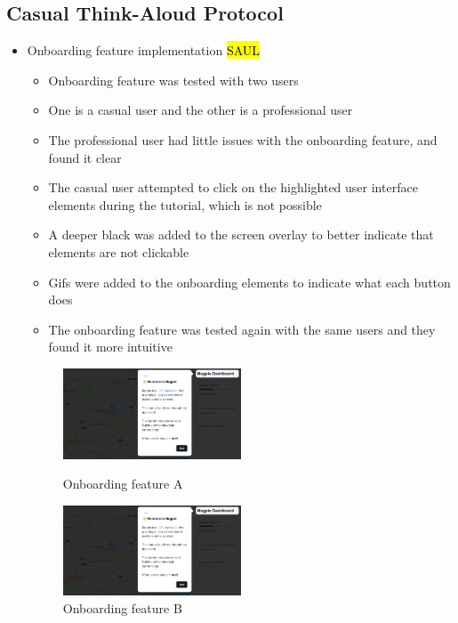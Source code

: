 \documentclass{report}
\begin{document}
\subsection{Casual Think-Aloud Protocol}
\begin{itemize}
    \item Onboarding feature implementation \hl{SAUL}
    \begin{itemize}
        \item Onboarding feature was tested with two users
        \item One is a casual user and the other is a professional user
        \item The professional user had little issues with the onboarding
        feature, and found it clear
        \item The casual user attempted to click on the highlighted user
        interface elements during the tutorial, which is not possible
        \item A deeper black was added to the screen overlay to better indicate
        that elements are not clickable
        \item Gifs were added to the onboarding elements to indicate what each
        button does
        \item The onboarding feature was tested again with the same users and
        they found it more intuitive
    \end{itemize}

    \begin{figure}
        \centering
        \includegraphics[width=0.5\textwidth]{Figures/fig10.png}
        \caption{Onboarding feature A}

        \includegraphics[width=0.5\textwidth]{Figures/fig11.png}
        \caption{Onboarding feature B}
    \end{figure}


\end{itemize}
\end{document}
